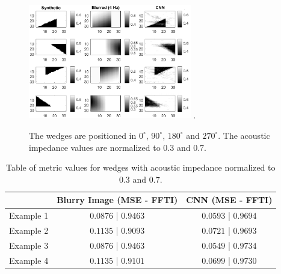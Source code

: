 \documentclass[conference]{IEEEtran}
\begin{document}
\begin{figure}[!t]
	\centering
	\includegraphics[width=2.8in]{Figs/teste2}
	\DeclareGraphicsExtensions.
	\caption{The wedges are positioned in $0^{\circ}$, $90^{\circ}$, $180^{\circ}$ and $270^{\circ}$. The acoustic impedance values are normalized to $0.3$ and $0.7$.}
	\label{fig_scenario2}
\end{figure}

\begin{table}[!t]
\renewcommand{\arraystretch}{1.2}
\caption{Table of metric values for wedges with acoustic impedance normalized to $0.3$ and $0.7$.}
\label{table_caso_3}
\centering
\begin{tabular}{|c||c||c|}
\hline
 & Blurry Image (MSE - FFTI) & CNN (MSE - FFTI)\\
\hline
Example 1 & $0.0876$ | $0.9463$ & $0.0593$ | $0.9694$\\
\hline
Example 2 & $0.1135$ | $0.9093$ & $0.0721$ | $0.9693$ \\
\hline
Example 3 & $0.0876$ | $0.9463$ & $0.0549$ | $0.9734$\\
\hline
Example 4 & $0.1135$ | $0.9101$ & $0.0699$ | $0.9730$\\ 
\hline
\end{tabular}
\end{table}
\end{document}
